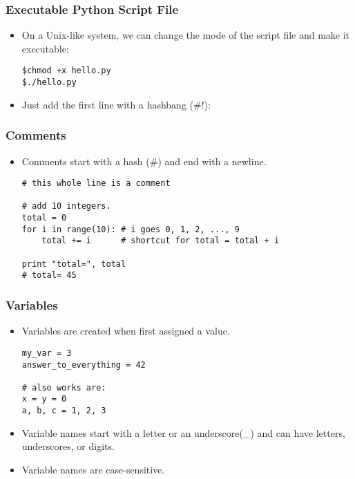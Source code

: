 \documentclass{beamer}
\begin{document}
\begin{frame}[fragile]
\frametitle{Executable Python Script File}
\begin{itemize}
\item On a Unix-like system, we can change the mode
      of the script file and make it executable:
\begin{lstlisting}
$chmod +x hello.py
$./hello.py
\end{lstlisting}
\item Just add the first line with
      a hashbang (\#!):
      
\end{itemize}
\end{frame}

\begin{frame}[fragile]
\frametitle{Comments}
\begin{itemize}
\item Comments start with a hash (\#) and end
      with a newline.
\begin{lstlisting}
# this whole line is a comment

# add 10 integers.
total = 0
for i in range(10): # i goes 0, 1, 2, ..., 9
    total += i      # shortcut for total = total + i

print "total=", total
# total= 45
\end{lstlisting}
\end{itemize}
\end{frame}

\begin{frame}[fragile]
\frametitle{Variables}
\begin{itemize}
\item Variables are created when first assigned a value.
\begin{lstlisting}
my_var = 3
answer_to_everything = 42

# also works are:
x = y = 0
a, b, c = 1, 2, 3
\end{lstlisting}
\item Variable names start with a letter or an
      underscore(\_) and can have letters, underscores,
      or digits. 
\item Variable names are case-sensitive.
\end{itemize}
\end{frame}
\end{document}
